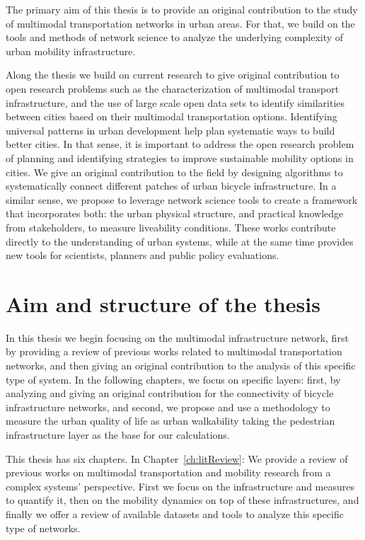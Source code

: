 The primary aim of this thesis is to provide an original contribution to the study of multimodal transportation networks in urban areas. For that, we build on the tools and methods of network science to analyze the underlying complexity of urban mobility infrastructure.

Along the thesis we build on current research to give original contribution to open research problems such as the characterization of multimodal transport infrastructure, and the use of large scale open data sets to identify similarities between cities based on their multimodal transportation options. Identifying universal patterns in urban development help plan systematic ways to build better cities. In that sense, it is important to address the open research problem of planning and identifying strategies to improve sustainable mobility options in cities. We give an original contribution to the field by designing algorithms to systematically connect different patches of urban bicycle infrastructure. In a similar sense, we propose to leverage network science tools to create a framework that incorporates both: the urban physical structure, and practical knowledge from stakeholders, to measure liveability conditions. These works contribute directly to the understanding of urban systems, while at the same time provides new tools for scientists, planners and public policy evaluations.

\section{Aim and structure of the thesis}

In this thesis we begin focusing on the multimodal infrastructure network, first by providing a review of previous works related to multimodal transportation networks, and then giving an original contribution to the analysis of this specific type of system. In the following chapters, we focus on specific layers: first, by analyzing and giving an original contribution for the connectivity of bicycle infrastructure networks, and second, we propose and use a methodology to measure the urban quality of life as urban walkability taking the pedestrian infrastructure layer as the base for our calculations.

This thesis has six chapters. In Chapter~\ref{ch:litReview}: We provide a review of previous works on multimodal transportation and mobility research from a complex systems' perspective. First we focus on the infrastructure and measures to quantify it, then on the mobility dynamics on top of these infrastructures, and finally we offer a review of available datasets and tools to analyze this specific type of networks.

